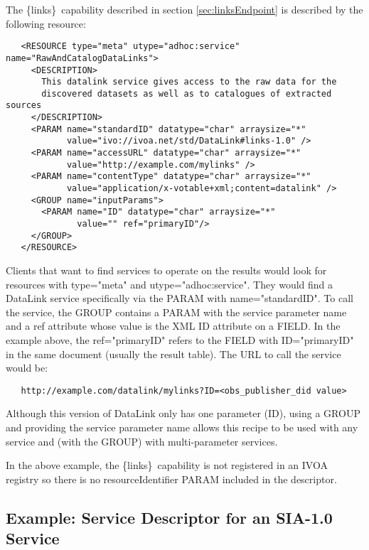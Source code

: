 \documentclass[11pt,a4paper]{ivoa}
\newcommand{\blinks}{\{links\}}
\newcommand{\attval}[2]{#1={\allowbreak}{"}#2{"}}
\begin{document}
The \blinks\ capability described in section \ref{sec:linksEndpoint}
is described by the following resource:
\begin{verbatim}
   <RESOURCE type="meta" utype="adhoc:service" name="RawAndCatalogDataLinks">
     <DESCRIPTION>
       This datalink service gives access to the raw data for the
       discovered datasets as well as to catalogues of extracted sources
     </DESCRIPTION>
     <PARAM name="standardID" datatype="char" arraysize="*"
            value="ivo://ivoa.net/std/DataLink#links-1.0" />
     <PARAM name="accessURL" datatype="char" arraysize="*"
            value="http://example.com/mylinks" />
     <PARAM name="contentType" datatype="char" arraysize="*" 
            value="application/x-votable+xml;content=datalink" />
     <GROUP name="inputParams">
       <PARAM name="ID" datatype="char" arraysize="*"
              value="" ref="primaryID"/>
     </GROUP>
   </RESOURCE>
\end{verbatim}

Clients that want to find services to operate on the results would look
for resources with \attval{type}{meta} and \attval{utype}{adhoc:service}.
They would find a DataLink service specifically via the PARAM with
\attval{name}{standardID}. To call the service, the GROUP contains a PARAM
with the service parameter name and a ref attribute whose value is the
XML ID attribute on a FIELD. In the example above, the \attval{ref}{primaryID}
refers to the FIELD with \attval{ID}{primaryID} in the same document (usually
the result table). The URL to call the service would be:
\begin{verbatim}
   http://example.com/datalink/mylinks?ID=<obs_publisher_did value>
\end{verbatim}

Although this version of DataLink only has one parameter (ID), using a
GROUP and providing the service parameter name allows this recipe to be
used with any service and (with the GROUP) with multi-parameter services.

In the above example, the \blinks\ capability is not registered in an
IVOA registry so there is no resourceIdentifier PARAM included in the
descriptor.


\subsection{Example: Service Descriptor for an SIA-1.0 Service}
\end{document}
